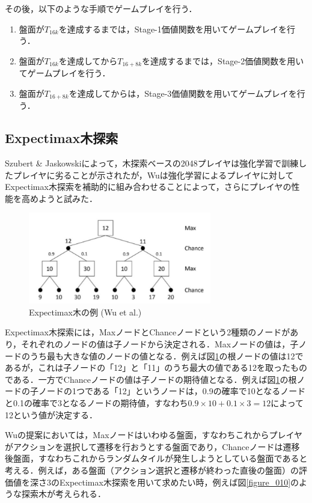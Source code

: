 \documentclass{suribt}
\begin{document}
その後，以下のような手順でゲームプレイを行う．

\begin{enumerate}
\item 盤面が$T_{16k}$を達成するまでは，Stage-1価値関数を用いてゲームプレイを行う．
\item 盤面が$T_{16k}$を達成してから$T_{16+8k}$を達成するまでは，Stage-2価値関数を用いてゲームプレイを行う．
\item 盤面が$T_{16+8k}$を達成してからは，Stage-3価値関数を用いてゲームプレイを行う．
\end{enumerate}

\subsection{Expectimax木探索}
Szubert \& Jaskowskiによって，木探索ベースの2048プレイヤは強化学習で訓練したプレイヤに劣ることが示されたが，Wuは強化学習によるプレイヤに対してExpectimax木探索を補助的に組み合わせることによって，さらにプレイヤの性能を高めようと試みた．

\begin{figure}[t]
	\begin{center}
	\includegraphics[width=8cm]{figure_003.png}
	\caption{Expectimax木の例 (Wu et al.)}
	\label{figure_003}
	\end{center}
\end{figure}

Expectimax木探索には，MaxノードとChanceノードという2種類のノードがあり，それぞれのノードの値は子ノードから決定される．Maxノードの値は，子ノードのうち最も大きな値のノードの値となる．例えば図\ref{figure_003}の根ノードの値は12であるが，これは子ノードの「12」と「11」のうち最大の値である12を取ったものである．一方でChanceノードの値は子ノードの期待値となる．例えば図\ref{figure_003}の根ノードの子ノードの1つである「12」というノードは，0.9の確率で10となるノードと0.1の確率で3となるノードの期待値，すなわち$0.9 \times 10 + 0.1 \times 3 = 12$によって12という値が決定する．

Wuの提案においては，Maxノードはいわゆる盤面，すなわちこれからプレイヤがアクションを選択して遷移を行おうとする盤面であり，Chanceノードは遷移後盤面，すなわちこれからランダムタイルが発生しようとしている盤面であると考える．例えば，ある盤面（アクション選択と遷移が終わった直後の盤面）の評価値を深さ3のExpectimax木探索を用いて求めたい時，例えば図\ref{figure_010}のような探索木が考えられる．
\end{document}

